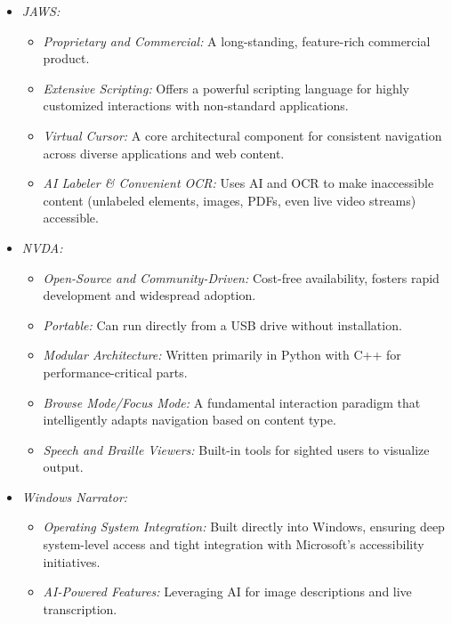 \begin{itemize}
    \item \emph{JAWS:}
    \begin{itemize}
        \item \emph{Proprietary and Commercial:} A long-standing, feature-rich commercial product.
        \item \emph{Extensive Scripting:} Offers a powerful scripting language for highly customized interactions with non-standard applications.\cite{JAWSScripting}
        \item \emph{Virtual Cursor:} A core architectural component for consistent navigation across diverse applications and web content.\cite{JAWSKeyboardGestures}
        \item \emph{AI Labeler \& Convenient OCR:} Uses AI and OCR to make inaccessible content (unlabeled elements, images, PDFs, even live video streams) accessible.\cite{JAWSAILabeler}\cite{JAWSOCR}
    \end{itemize}
    \item \emph{NVDA:}
    \begin{itemize}
        \item \emph{Open-Source and Community-Driven:} Cost-free availability, fosters rapid development and widespread adoption.\cite{NVAccess}
        \item \emph{Portable:} Can run directly from a USB drive without installation.\cite{NVAccess}
        \item \emph{Modular Architecture:} Written primarily in Python with C++ for performance-critical parts.\cite{AssistivLabsNVDAArch}
        \item \emph{Browse Mode/Focus Mode:} A fundamental interaction paradigm that intelligently adapts navigation based on content type.\cite{NVDAKeyboardCommands}
        \item \emph{Speech and Braille Viewers:} Built-in tools for sighted users to visualize output.\cite{NVDASpeech}\cite{NVDABraille}
    \end{itemize}
    \item \emph{Windows Narrator:}
    \begin{itemize}
        \item \emph{Operating System Integration:} Built directly into Windows, ensuring deep system-level access and tight integration with Microsoft's accessibility initiatives.\cite{NarratorGuide}
        \item \emph{AI-Powered Features:} Leveraging AI for image descriptions and live transcription.\cite{NarratorImageDescriptions}\cite{NarratorWhatsNew}

\end{itemize}
\end{itemize}
